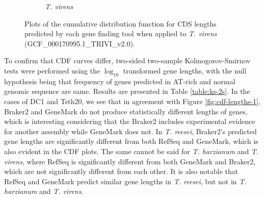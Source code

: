 \begin{figure}
  \centering
  \begin{subfigure}{\textwidth}
    \label{fig:tvirens-lengths}
    \caption{\textit{T. virens}}
  \end{subfigure}
  \caption[CDF plots for \textit{T. virens}]{Plots of the cumulative distribution
    function for CDS lengths predicted by each gene finding tool when
    applied to \textit{T. virens} (GCF\_000170995.1\_TRIVI\_v2.0).}
  \label{fig:cdf-lengths-3}
\end{figure}

To confirm that CDF curves differ, two-sided two-sample
Kolmogorov-Smirnov\cite{ref1} tests were performed using the
$\log_{10}$ transformed gene lengths, with the null hypothesis being
that frequency of genes predicted in AT-rich and normal genomic
sequence are same. Results are presented in Table
\ref{table:ks-2s}. In the cases of DC1 and Tsth20, we see that in
agreement with Figure \ref{fig:cdf-lengths-1}, Braker2 and GeneMark do
not produce statistically different lengths of genes, which is
interesting considering that the Braker2 includes experimental
evidence for another assembly while GeneMark does not. In
\textit{T. reesei}, Braker2's predicted gene lengths are significantly
different from both RefSeq and GeneMark, which is also evident in the
CDF plots. The same cannot be said for \textit{T. harzianum} and
\textit{T. virens}, where RefSeq is significantly different from both
GeneMark and Braker2, which are not significantly different from each
other. It is also notable that RefSeq and GeneMark predict similar
gene lengths in \textit{T. reesei}, but not in \textit{T. harzianum}
and \textit{T. virens.}

